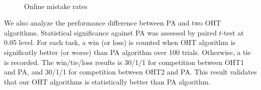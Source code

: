 \documentclass[twocolumn]{article}
\begin{document}
\begin{figure}[!htb]
\begin{center}
  \\
  
  \caption{Online mistake rates}
  \label{Online mistake rates}
\end{center}
\end{figure}

We also analyze the performance difference between PA and two OHT algorithms.
Statistical significance against PA was assessed by paired $t$-test at 0.05 level.
For each task, a win (or loss) is counted when OHT algorithm is significatly better (or worse) than PA algorithm over 100 trials.
Otherwise, a tie is recorded.
The win/tie/loss results is 30/1/1 for competition between OHT1 and PA, and 30/1/1 for competition between  OHT2 and PA.
This result validates that our OHT algorithms is statistically better than PA algorithm.
\end{document}
